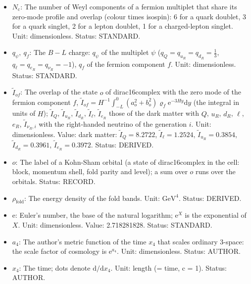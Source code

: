 \documentclass[
  10pt,
]{article}
\begin{document}
\begin{itemize}
  medium (electron, proton, neutron); a sum over \(f\) runs over these
  species. Status: STANDARD.
\item
  \(N_{\mathrm{c}}\): The number of Weyl components of a fermion
  multiplet that share its zero-mode profile and overlap (colour times
  isospin): 6 for a quark doublet, 3 for a quark singlet, 2 for a lepton
  doublet, 1 for a charged-lepton singlet. Unit: dimensionless. Status:
  STANDARD.
\item
  \(q_\psi,\ q_f\): The \(B - L\) charge: \(q_\psi\) of the multiplet
  \(\psi\) (\(q_Q = q_{u_R} = q_{d_R} = \frac13\),
  \(q_\ell = q_{e_R} = q_{\nu_R} = -1\)), \(q_f\) of the fermion
  component \(f\). Unit: dimensionless. Status: STANDARD.
\item
  \(\tilde I_{of}\): The overlap of the state \(o\) of dirac16complex
  with the zero mode of the fermion component \(f\),
  \(\tilde I_{of} = H^{-1}\int_{-L}^{0}(a_o^2 + b_o^2)\varrho_f\mathrm{e}^{-3Hy}\mathrm{d}y\)
  (the integral in units of \(H\)); \(\tilde I_Q\), \(\tilde I_{u_R}\),
  \(\tilde I_{d_R}\), \(\tilde I_\ell\), \(\tilde I_{e_R}\) those of the
  dark matter with \(Q\), \(u_R\), \(d_R\), \(\ell\), \(e_R\),
  \(\tilde I_{\nu_R,i}\) with the right-handed neutrino of the
  generation \(i\). Unit: dimensionless. Value: dark matter:
  \(\tilde I_Q = 8.2722\), \(\tilde I_\ell = 1.2524\),
  \(\tilde I_{u_R} = 0.3854\), \(\tilde I_{d_R} = 0.3961\),
  \(\tilde I_{e_R} = 0.3972\). Status: DERIVED.
\item
  \(o\): The label of a Kohn-Sham orbital (a state of dirac16complex in
  the cell: block, momentum shell, fold parity and level); a sum over
  \(o\) runs over the orbitals. Status: RECORD.
\item
  \(\rho_{\mathrm{fold}}\): The energy density of the fold bands. Unit:
  \(\mathrm{GeV}^{4}\). Status: DERIVED.
\item
  \(\mathrm{e}\): Euler's number, the base of the natural logarithm;
  \(\mathrm{e}^{X}\) is the exponential of \(X\). Unit: dimensionless.
  Value: 2.718281828. Status: STANDARD.
\item
  \(a_4\): The author's metric function of the time \(x_4\) that scales
  ordinary 3-space: the scale factor of cosmology is
  \(\mathrm{e}^{a_4}\). Unit: dimensionless. Status: AUTHOR.
\item
  \(x_4\): The time; dots denote \(\mathrm{d}/\mathrm{d}x_4\). Unit:
  length (= time, c = 1). Status: AUTHOR.
\end{itemize}
\end{document}
